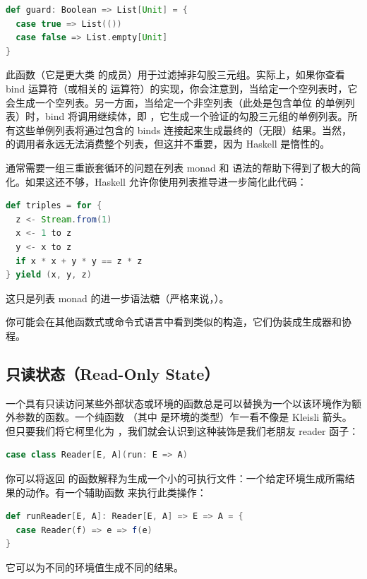 \begin{lstlisting}[language=Scala]
def guard: Boolean => List[Unit] = {
  case true => List(())
  case false => List.empty[Unit]
}
\end{lstlisting}
此函数（它是更大类  的成员）用于过滤掉非勾股三元组。实际上，如果你查看 bind 运算符（或相关的 \code{>>} 运算符）的实现，你会注意到，当给定一个空列表时，它会生成一个空列表。另一方面，当给定一个非空列表（此处是包含单位 \code{{[}(){]}} 的单例列表）时，bind 将调用继续体，即 ，它生成一个验证的勾股三元组的单例列表。所有这些单例列表将通过包含的 binds 连接起来生成最终的（无限）结果。当然， 的调用者永远无法消费整个列表，但这并不重要，因为 Haskell 是惰性的。

通常需要一组三重嵌套循环的问题在列表 monad 和  语法的帮助下得到了极大的简化。如果这还不够，Haskell 允许你使用列表推导进一步简化此代码：

\begin{lstlisting}[language=Scala]
def triples = for {
  z <- Stream.from(1)
  x <- 1 to z
  y <- x to z
  if x * x + y * y == z * z
} yield (x, y, z)
\end{lstlisting}
这只是列表 monad 的进一步语法糖（严格来说，）。

你可能会在其他函数式或命令式语言中看到类似的构造，它们伪装成生成器和协程。

\subsection{只读状态（Read-Only State）}

一个具有只读访问某些外部状态或环境的函数总是可以替换为一个以该环境作为额外参数的函数。一个纯函数 （其中  是环境的类型）乍一看不像是 Kleisli 箭头。但只要我们将它柯里化为 ，我们就会认识到这种装饰是我们老朋友 reader 函子：

\begin{lstlisting}[language=Scala]
case class Reader[E, A](run: E => A)
\end{lstlisting}
你可以将返回  的函数解释为生成一个小的可执行文件：一个给定环境生成所需结果的动作。有一个辅助函数  来执行此类操作：

\begin{lstlisting}[language=Scala]
def runReader[E, A]: Reader[E, A] => E => A = {
  case Reader(f) => e => f(e)
}
\end{lstlisting}
它可以为不同的环境值生成不同的结果。

